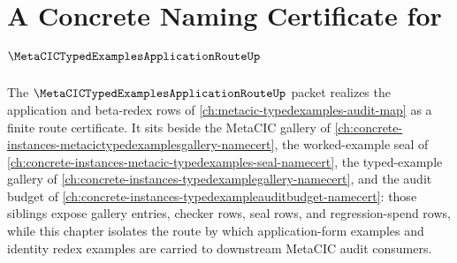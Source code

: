 \chapter{A Concrete Naming Certificate for $\MetaCICTypedExamplesApplicationRouteUp$}
\label{ch:concrete-instances-metacictypedexamplesapplicationroute-namecert}

The $\MetaCICTypedExamplesApplicationRouteUp$ packet realizes the application and beta-redex rows of \autoref{ch:metacic-typedexamples-audit-map} as a finite route certificate. It sits beside the MetaCIC gallery of \autoref{ch:concrete-instances-metacictypedexamplesgallery-namecert}, the worked-example seal of \autoref{ch:concrete-instances-metacic-typedexamples-seal-namecert}, the typed-example gallery of \autoref{ch:concrete-instances-typedexamplegallery-namecert}, and the audit budget of \autoref{ch:concrete-instances-typedexampleauditbudget-namecert}: those siblings expose gallery entries, checker rows, seal rows, and regression-spend rows, while this chapter isolates the route by which application-form examples and identity redex examples are carried to downstream MetaCIC audit consumers.


